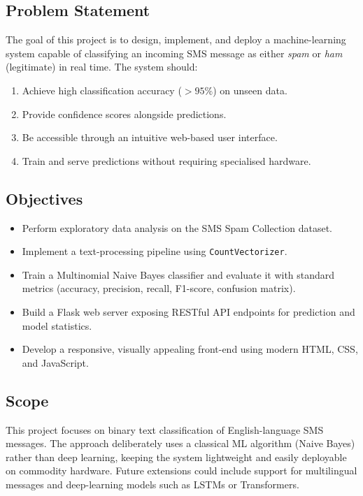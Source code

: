 \documentclass[paper=a4, fontsize=11pt]{scrartcl}
\numberwithin{equation}{section}
\numberwithin{figure}{section}
\numberwithin{table}{section}
\begin{document}
\subsection{Problem Statement}
The goal of this project is to design, implement, and deploy a machine-learning system capable of classifying an incoming SMS message as either \textit{spam} or \textit{ham} (legitimate) in real time.  The system should:
\begin{enumerate}
    \item Achieve high classification accuracy ($> 95\%$) on unseen data.
    \item Provide confidence scores alongside predictions.
    \item Be accessible through an intuitive web-based user interface.
    \item Train and serve predictions without requiring specialised hardware.
\end{enumerate}

\subsection{Objectives}
\begin{itemize}
    \item Perform exploratory data analysis on the SMS Spam Collection dataset.
    \item Implement a text-processing pipeline using \texttt{CountVectorizer}.
    \item Train a Multinomial Naive Bayes classifier and evaluate it with standard metrics (accuracy, precision, recall, F1-score, confusion matrix).
    \item Build a Flask web server exposing RESTful API endpoints for prediction and model statistics.
    \item Develop a responsive, visually appealing front-end using modern HTML, CSS, and JavaScript.
\end{itemize}

\subsection{Scope}
This project focuses on binary text classification of English-language SMS messages.  The approach deliberately uses a classical ML algorithm (Naive Bayes) rather than deep learning, keeping the system lightweight and easily deployable on commodity hardware.  Future extensions could include support for multilingual messages and deep-learning models such as LSTMs or Transformers.
\end{document}
